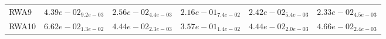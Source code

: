\documentclass{article}
\begin{document}
\begin{table}
\begin{scriptsize}
\begin{tabular}{llllll}
RWA9 & $  4.39e-02_{ 9.2e-03}$ & $  2.56e-02_{ 4.4e-03}$ & $  2.16e-01_{ 7.4e-02}$ & \cellcolor{gray25}$  2.42e-02_{ 5.4e-03}$ & \cellcolor{gray95}$  2.33e-02_{ 4.5e-03}$ \\
RWA10 & $  6.62e-02_{ 1.3e-02}$ & \cellcolor{gray95}$  4.44e-02_{ 2.3e-03}$ & $  3.57e-01_{ 1.4e-02}$ & \cellcolor{gray25}$  4.44e-02_{ 2.0e-03}$ & $  4.66e-02_{ 2.4e-03}$ \\
\hline
\end{tabular}
\end{scriptsize}
\end{table}
\end{document}
